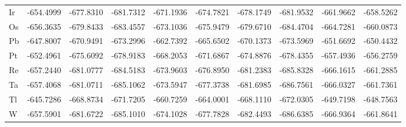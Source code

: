 \documentclass[a4paper, 12pt]{article}
\begin{document}
\begin{table}[htbp]
{\begin{tabular}{l *{9}{c}}
      Ir & -654.4999 & -677.8310 & -681.7312 & -671.1936 & -674.7821 & -678.1749 & -681.9532 & -661.9662 & -658.5262 \\
      Os & -656.3635 & -679.8433 & -683.4557 & -673.1036 & -675.9479 & -679.6710 & -684.4704 & -664.7281 & -660.0873 \\
      Pb & -647.8007 & -670.9491 & -673.2996 & -662.7392 & -665.6502 & -670.1373 & -673.5969 & -651.6692 & -650.4432 \\
      Pt & -652.4961 & -675.6092 & -678.9183 & -668.2053 & -671.6867 & -674.8876 & -678.4355 & -657.4936 & -656.2759 \\
      Re & -657.2440 & -681.0777 & -684.5183 & -673.9603 & -676.8950 & -681.2383 & -685.8328 & -666.1615 & -661.2885 \\
      Ta & -657.4068 & -681.0711 & -685.1062 & -673.5947 & -677.3738 & -681.6985 & -686.7561 & -666.0327 & -661.7361 \\
      Tl & -645.7286 & -668.8734 & -671.7205 & -660.7259 & -664.0001 & -668.1110 & -672.0305 & -649.7198 & -648.7563 \\
      W  & -657.5901 & -681.6722 & -685.1010 & -674.1028 & -677.7828 & -682.4493 & -686.6385 & -666.9364 & -661.8641 \\
      \bottomrule
    \end{tabular}
  }
\end{table}
\end{document}
